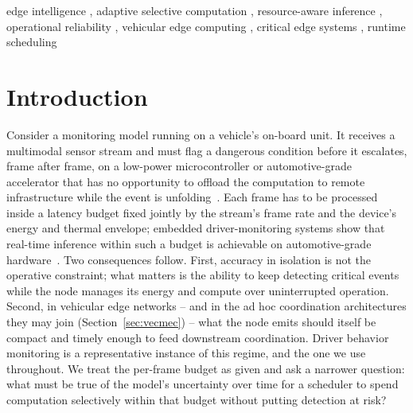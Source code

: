 \documentclass[a4paper,fleqn]{cas-dc}
\begin{document}
\begin{keywords}
edge intelligence \sep
adaptive selective computation \sep
resource-aware inference \sep
operational reliability \sep
vehicular edge computing \sep
critical edge systems \sep
runtime scheduling
\end{keywords}
\maketitle
{}
\section{Introduction}
\label{sec:introducao}
Consider a monitoring model running on a vehicle's on-board unit. It receives a
multimodal sensor stream and must flag a dangerous condition before it escalates,
frame after frame, on a low-power microcontroller or automotive-grade accelerator
that has no opportunity to offload the computation to remote infrastructure while
the event is unfolding~\cite{bouhsissin2023driver,ortega2020dmd}. Each frame has to
be processed inside a latency budget fixed jointly by the stream's frame rate and
the device's energy and thermal envelope; embedded driver-monitoring systems show
that real-time inference within such a budget is achievable on automotive-grade
hardware~\cite{hariharan2023driveredge,tinydl2025driverstate}. Two consequences
follow. First, accuracy in isolation is not the operative constraint; what
matters is the ability to keep detecting critical events while the node manages
its energy and compute over uninterrupted operation. Second, in vehicular edge networks -- and in the ad hoc coordination
architectures they may join (Section~\ref{sec:vecmec}) -- what the node emits should itself be compact and timely enough to feed
downstream coordination. Driver behavior monitoring is a representative instance of
this regime, and the one we use throughout. We treat the per-frame budget as given
and ask a narrower question: what must be true of the model's uncertainty over time
for a scheduler to spend computation selectively within that budget without putting
detection at risk?
\end{document}

